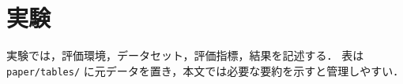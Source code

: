 \section{実験}

実験では，評価環境，データセット，評価指標，結果を記述する．
表は \texttt{paper/tables/} に元データを置き，本文では必要な要約を示すと管理しやすい．
